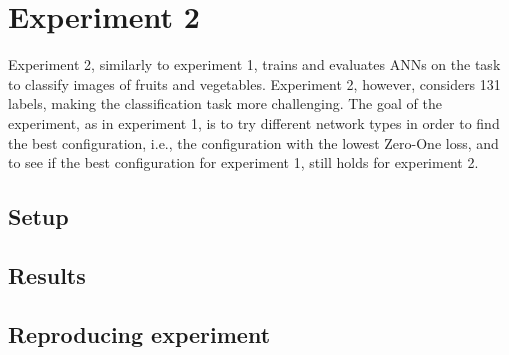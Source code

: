 \section{Experiment 2}
\label{sec:exp2}
Experiment 2, similarly to experiment 1, trains and evaluates ANNs on the task to classify images of fruits and vegetables. Experiment 2, however, considers 131 labels, making the classification task more challenging. The goal of the experiment, as in experiment 1, is to try different network types in order to find the best configuration, i.e., the configuration with the lowest Zero-One loss, and to see if the best configuration for experiment 1, still holds for experiment 2.
\subsection{Setup}
\subsection{Results}

\subsection{Reproducing experiment}
